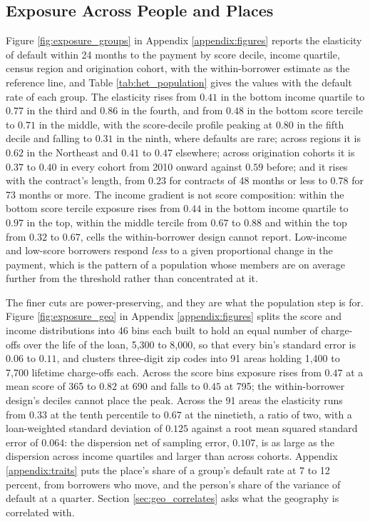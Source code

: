 \subsection{Exposure Across People and Places}\label{sec:exposure}

Figure \ref{fig:exposure_groups} in Appendix \ref{appendix:figures} reports the elasticity of default within 24 months to the payment by score decile, income quartile, census region and origination cohort, with the within-borrower estimate as the reference line, and Table \ref{tab:het_population} gives the values with the default rate of each group. The elasticity rises from $0.41$ in the bottom income quartile to $0.77$ in the third and $0.86$ in the fourth, and from $0.48$ in the bottom score tercile to $0.71$ in the middle, with the score-decile profile peaking at $0.80$ in the fifth decile and falling to $0.31$ in the ninth, where defaults are rare; across regions it is $0.62$ in the Northeast and $0.41$ to $0.47$ elsewhere; across origination cohorts it is $0.37$ to $0.40$ in every cohort from 2010 onward against $0.59$ before; and it rises with the contract's length, from $0.23$ for contracts of 48 months or less to $0.78$ for 73 months or more. The income gradient is not score composition: within the bottom score tercile exposure rises from $0.44$ in the bottom income quartile to $0.97$ in the top, within the middle tercile from $0.67$ to $0.88$ and within the top from $0.32$ to $0.67$, cells the within-borrower design cannot report. Low-income and low-score borrowers respond \emph{less} to a given proportional change in the payment, which is the pattern of a population whose members are on average further from the threshold rather than concentrated at it.

The finer cuts are power-preserving, and they are what the population step is for. Figure \ref{fig:exposure_geo} in Appendix \ref{appendix:figures} splits the score and income distributions into 46 bins each built to hold an equal number of charge-offs over the life of the loan, 5,300 to 8,000, so that every bin's standard error is $0.06$ to $0.11$, and clusters three-digit zip codes into 91 areas holding 1,400 to 7,700 lifetime charge-offs each. Across the score bins exposure rises from $0.47$ at a mean score of 365 to $0.82$ at 690 and falls to $0.45$ at 795; the within-borrower design's deciles cannot place the peak. Across the 91 areas the elasticity runs from $0.33$ at the tenth percentile to $0.67$ at the ninetieth, a ratio of two, with a loan-weighted standard deviation of $0.125$ against a root mean squared standard error of $0.064$: the dispersion net of sampling error, $0.107$, is as large as the dispersion across income quartiles and larger than across cohorts. Appendix \ref{appendix:traits} puts the place's share of a group's default rate at 7 to 12 percent, from borrowers who move, and the person's share of the variance of default at a quarter. Section \ref{sec:geo_correlates} asks what the geography is correlated with.

